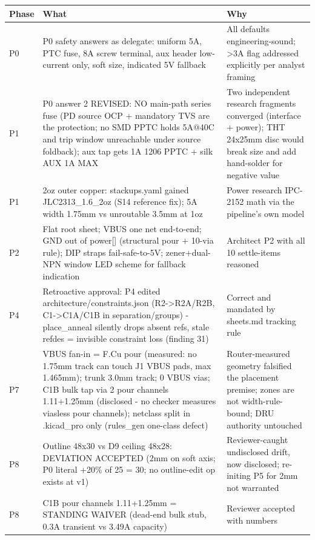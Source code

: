 \documentclass[11pt,a4paper]{article}
\begin{document}
{\small
\begin{longtable}{lp{5.2cm}p{7.2cm}}
\toprule
\textbf{Phase} & \textbf{What} & \textbf{Why} \\
\midrule
\endhead
P0 & P0 safety answers as delegate: uniform 5A, PTC fuse, 8A screw terminal, aux header low-current only, soft size, indicated 5V fallback & All defaults engineering-sound; \textgreater{}3A flag addressed explicitly per analyst framing \\
P1 & P0 answer 2 REVISED: NO main-path series fuse (PD source OCP + mandatory TVS are the protection; no SMD PPTC holds 5A@40C and trip window unreachable under source foldback); aux tap gets 1A 1206 PPTC + silk AUX 1A MAX & Two independent research fragments converged (interface + power); THT 24x25mm disc would break size and add hand-solder for negative value \\
P1 & 2oz outer copper: stackups.yaml gained JLC2313\_1.6\_2oz (S14 reference fix); 5A width 1.75mm vs unroutable 3.5mm at 1oz & Power research IPC-2152 math via the pipeline's own model \\
P2 & Flat root sheet; VBUS one net end-to-end; GND out of power{[}{]} (structural pour + 10-via rule); DIP straps fail-safe-to-5V; zener+dual-NPN window LED scheme for fallback indication & Architect P2 with all 10 settle-items reasoned \\
P4 & Retroactive approval: P4 edited architecture/constraints.json (R2-\textgreater{}R2A/R2B, C1-\textgreater{}C1A/C1B in separation/groups) - place\_anneal silently drops absent refs, stale refdes = invisible constraint loss (finding 31) & Correct and mandated by sheets.md tracking rule \\
P7 & VBUS fan-in = F.Cu pour (measured: no 1.75mm track can touch J1 VBUS pads, max 1.465mm); trunk 3.0mm track; 0 VBUS vias; C1B bulk tap via 2 pour channels 1.11+1.25mm (disclosed - no checker measures viasless pour channels); netclass split in .kicad\_pro only (rules\_gen one-class defect) & Router-measured geometry falsified the placement premise; zones are not width-rule-bound; DRU authority untouched \\
P8 & Outline 48x30 vs D9 ceiling 48x28: DEVIATION ACCEPTED (2mm on soft axis; P0 literal +20\% of 25 = 30; no outline-edit op exists at v1) & Reviewer-caught undisclosed drift, now disclosed; re-initing P5 for 2mm not warranted \\
P8 & C1B pour channels 1.11+1.25mm = STANDING WAIVER (dead-end bulk stub, 0.3A transient vs 3.49A capacity) & Reviewer accepted with numbers \\

\end{longtable}}
\end{document}

